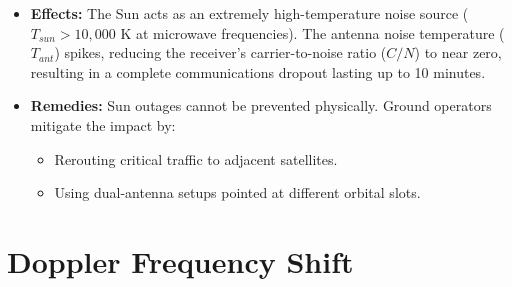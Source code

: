 \documentclass[12pt,a4paper]{article}
\begin{document}
\begin{tcolorbox}[tikzbox, title={Sun Transit Outage Alignment}]
\centering
{}
\end{tcolorbox}

\begin{itemize}[leftmargin=*, itemsep=4pt]
  \item \textbf{Effects:} The Sun acts as an extremely high-temperature noise source ($T_{sun} > 10,000 \text{ K}$ at microwave frequencies). The antenna noise temperature ($T_{ant}$) spikes, reducing the receiver's carrier-to-noise ratio ($C/N$) to near zero, resulting in a complete communications dropout lasting up to 10 minutes.
  \item \textbf{Remedies:} Sun outages cannot be prevented physically. Ground operators mitigate the impact by:
    \begin{itemize}[leftmargin=*, itemsep=2pt, topsep=2pt]
      \item Rerouting critical traffic to adjacent satellites.
      \item Using dual-antenna setups pointed at different orbital slots.
    \end{itemize}
\end{itemize}

\section{Doppler Frequency Shift}
\end{document}

